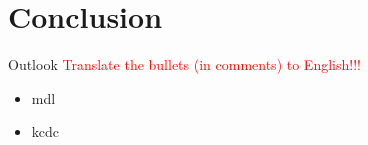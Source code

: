 \section{Conclusion}

\begin{frame}{Outlook}
\textcolor{red}{Translate the bullets (in comments) to English!!!}
    \begin{itemize}
    \item mdl
    \item kcdc
    \end{itemize}
\end{frame}


